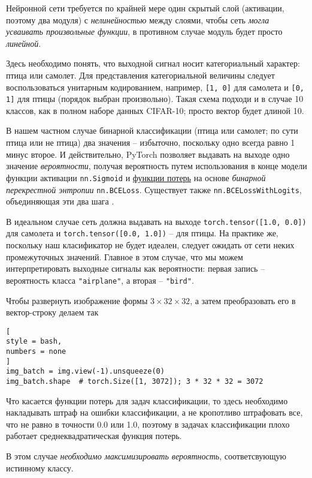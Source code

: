 \documentclass[%
	11pt,
	a4paper,
	utf8,
		]{article}
\begin{document}
Нейронной сети требуется по крайней мере один скрытый слой (активации, поэтому два модуля) с \emph{нелинейностью} между слоями, чтобы сеть \emph{могла усваивать произвольные функции}, в противном случае модуль будет просто \emph{линейной}.

Здесь необходимо понять, что выходной сигнал носит категориальный характер: птица или самолет. Для представления категориальной величины следует воспользоваться унитарным кодированием, например, \verb|[1, 0]| для самолета и \verb|[0, 1]| для птицы (порядок выбран произвольно). Такая схема подходи и в случае 10 классов, как в полном наборе данных CIFAR-10; просто вектор будет длиной 10.

В нашем частном случае бинарной классификации (птица или самолет; по сути птица или не птица) два значения -- избыточно, поскольку одно всегда равно 1 минус второе. И действительно, PyTorch позволяет выдавать на выходе одно значение \emph{вероятности}, получая вероятность путем использования в конце модели функции активации \verb|nn.Sigmoid| и \underline{функции потерь} на основе \emph{бинарной перекрестной энтропии} \verb|nn.BCELoss|. Существует также \verb|nn.BCELossWithLogits|, объединяющая эти два шага \cite[]{pytorch-2022}.

В идеальном случае сеть должна выдавать на выходе \verb|torch.tensor([1.0, 0.0])| для самолета и \verb|torch.tensor([0.0, 1.0])| -- для птицы. На практике же, поскольку наш класификатор не будет идеален, следует ожидать от сети неких промежуточных значений. Главное в этом случае, что мы можем интерпретировать выходные сигналы как вероятности: первая запись -- вероятность класса \verb|"airplane"|, а вторая -- \verb|"bird"|.

Чтобы развернуть изображение формы $3 \times 32 \times 32$, а затем преобразовать его в вектор-строку делаем так
\begin{lstlisting}[
style = bash,
numbers = none
]
img_batch = img.view(-1).unsqueeze(0)
img_batch.shape  # torch.Size([1, 3072]); 3 * 32 * 32 = 3072
\end{lstlisting}

Что касается функции потерь для задач классификации, то здесь необходимо накладывать штраф на ошибки классификации, а не кропотливо штрафовать все, что не равно в точности 0.0 или 1.0, поэтому в задачах классификации плохо работает среднеквадратическая функция потерь.

В этом случае \emph{необходимо максимизировать вероятность}, соответсвующую истинному классу.
\end{document}
